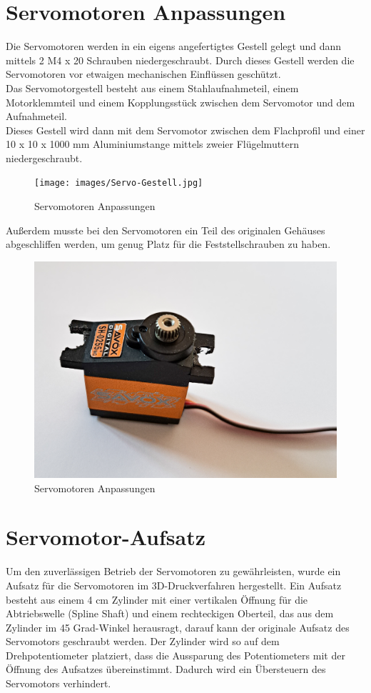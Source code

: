 \section{Servomotoren Anpassungen}
Die Servomotoren werden in ein eigens angefertigtes Gestell gelegt und dann mittels 2 M4 x 20 Schrauben niedergeschraubt. Durch dieses Gestell werden die Servomotoren vor etwaigen mechanischen Einflüssen geschützt. \\
Das Servomotorgestell besteht aus einem Stahlaufnahmeteil, einem Motorklemmteil und einem Kopplungsstück zwischen dem Servomotor und dem Aufnahmeteil.\\
Dieses Gestell wird dann mit dem Servomotor zwischen dem Flachprofil und einer 10 x 10 x 1000 mm Aluminiumstange mittels zweier Flügelmuttern niedergeschraubt.\\
\begin{figure}[H]
	\centering
	\texttt{[image: images/Servo-Gestell.jpg]}
	\caption[Servomotoren Anpassungen]{Servomotoren Anpassungen}
	\label{fig:Servomotoren Gestell}
\end{figure}

\newpage
Außerdem musste bei den Servomotoren ein Teil des originalen Gehäuses abgeschliffen werden, um genug Platz für die Feststellschrauben zu haben.

\begin{figure}[H]
	\centering
	\includegraphics[width=0.5\linewidth]{images/Servo-Anpassungen.jpg}
	\caption[Servomotoren Anpassungen]{Servomotoren Anpassungen}
	\label{fig:Servomotoren Anpassungen}
\end{figure}


\section{Servomotor-Aufsatz}
Um den zuverlässigen Betrieb der Servomotoren zu gewährleisten, wurde ein Aufsatz für die Servomotoren im 3D-Druckverfahren hergestellt. Ein Aufsatz besteht aus einem 4 cm Zylinder mit einer vertikalen Öffnung für die  Abtriebswelle (Spline Shaft)  und einem rechteckigen Oberteil, das aus dem Zylinder im 45 Grad-Winkel herausragt, darauf kann der originale Aufsatz des Servomotors geschraubt werden. Der Zylinder wird so auf dem Drehpotentiometer platziert, dass die Aussparung des Potentiometers mit der Öffnung des Aufsatzes übereinstimmt. Dadurch wird ein Übersteuern des Servomotors verhindert.

